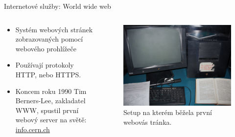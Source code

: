 \documentclass[aspectratio=169,xcolor=dvipsnames, t]{beamer}
\begin{document}
\begin{frame}{Internetové služby: World wide web}
    \vspace{-0.5cm}
    \begin{columns}
    \begin{column}{0.45\textwidth}
        \begin{itemize}
            \item Systém webových stránek zobrazovaných pomocí webového prohlížeče
            \item Používají protokoly HTTP, nebo HTTPS.
            \item Koncem roku 1990 Tim Berners-Lee, zakladatel WWW, spustil první webový server na světě: \href{https://info.cern.ch/}{info.cern.ch}
        \end{itemize}
\end{column}
\begin{column}{0.45\textwidth}
    \begin{figure}
        \includegraphics[width=\textwidth]{fw}
        \caption{Setup na kterém běžela první webovás tránka.}
    \end{figure}
\end{column}
\end{columns}
\end{frame}
\end{document}
